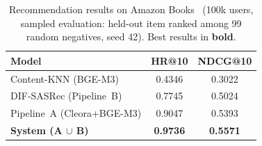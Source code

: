 \begin{table}[tbp]
\caption{Recommendation results on Amazon Books~\cite{hou2024amazon} (100k users, sampled
         evaluation: held-out item ranked among 99 random negatives,
         seed 42).
         Best results in \textbf{bold}.}
\label{tab:main_results}
\centering
\begin{tabular}{lcc}
\toprule
\textbf{Model} & \textbf{HR@10} & \textbf{NDCG@10} \\
\midrule
Content-KNN (BGE-M3)            & 0.4346 & 0.3022 \\
DIF-SASRec (Pipeline~B)         & 0.7745 & 0.5024 \\
Pipeline~A (Cleora+BGE-M3)      & 0.9047 & 0.5393 \\
\midrule
\textbf{System (A $\cup$ B)}    & \textbf{0.9736} & \textbf{0.5571} \\
\bottomrule
\end{tabular}
\end{table}
